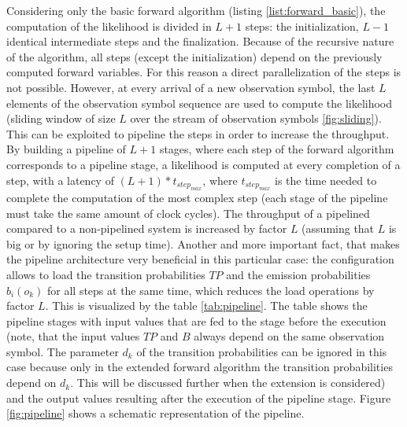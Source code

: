 \documentclass[mscthesis]{usiinfthesis}
\begin{document}
Considering only the basic forward algorithm (listing
\ref{list:forward_basic}), the computation of the likelihood is divided in
$L+1$ steps: the initialization, $L-1$ identical intermediate steps and the
finalization. Because of the recursive nature of the algorithm, all steps
(except the initialization) depend on the previously computed forward
variables. For this reason a direct parallelization of the steps is not
possible. However, at every arrival of a new observation symbol, the last $L$
elements of the observation symbol sequence are used to compute the likelihood
(sliding window of size $L$ over the stream of observation symbols
\ref{fig:sliding}). This can be exploited to pipeline the steps in order to
increase the throughput. By building a pipeline of $L+1$ stages, where each
step of the forward algorithm corresponds to a pipeline stage, a likelihood is
computed at every completion of a step, with a latency of
$(L+1)*t_{step_{max}}$, where $t_{step_{max}}$ is the time needed to complete
the computation of the most complex step (each stage of the pipeline must take
the same amount of clock cycles). The throughput of a pipelined compared to
a non-pipelined system is increased by factor $L$ (assuming that $L$ is big or
by ignoring the setup time).  Another and more important fact, that makes the
pipeline architecture very beneficial in this particular case: the
configuration allows to load the transition probabilities $TP$ and the emission
probabilities $b_i(o_k)$ for all steps at the same time, which reduces the load
operations by factor $L$.  This is visualized by the table \ref{tab:pipeline}.
The table shows the pipeline stages with input values that are fed to the stage
before the execution (note, that the input values $TP$ and $B$ always depend on
the same observation symbol. The parameter $d_k$ of the transition
probabilities can be ignored in this case because only in the extended forward
algorithm the transition probabilities depend on $d_k$. This will be discussed
further when the extension is considered) and the output values resulting after
the execution of the pipeline stage. Figure \ref{fig:pipeline} shows
a schematic representation of the pipeline.
\end{document}
